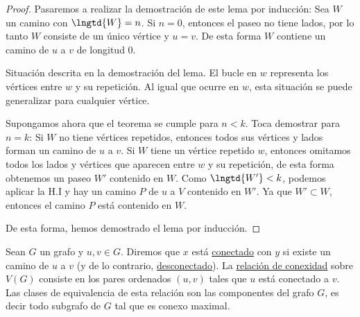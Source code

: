 \begin{proof}
    Pasaremos a realizar la demostración de este lema por inducción: Sea $W$ un camino con $\lngtd{W} = n$. Si $n = 0$, entonces el paseo no tiene lados, por lo tanto $W$ consiste de un único vértice y $u = v$. De esta forma $W$ contiene un camino de $u$ a $v$ de longitud $0$.
    
    \begin{marginfigure}
        \centering
        \caption{Situación descrita en la demostración del lema. El bucle en $w$ representa los vértices entre $w$ y su repetición. Al igual que ocurre en $w$, esta situación se puede generalizar para cualquier vértice.}
    \end{marginfigure}
    
    Supongamos ahora que el teorema se cumple para $n < k$. Toca demostrar para $n = k$: Si $W$ no tiene vértices repetidos, entonces todos sus vértices y lados forman un camino de $u$ a $v$. Si $W$ tiene un vértice repetido $w$, entonces omitamos todos los lados y vértices que aparecen entre $w$ y su repetición, de esta forma obtenemos un paseo $W'$ contenido en $W$. Como $\lngtd{W'} < k$, podemos aplicar la H.I y hay un camino $P$ de $u$ a $V$ contenido en $W'$. Ya que $W' \subset W$, entonces el camino $P$ está contenido en $W$.
    
    De esta forma, hemos demostrado el lema por inducción.
\end{proof}

\begin{defn}
    Sean $G$ un grafo y $u, v \in G$. Diremos que $x$ está \ul{conectado} con $y$ si existe un camino de $u$ a $v$ (y de lo contrario, \ul{desconectado}). La \ul{relación de conexidad} sobre $V(G)$ consiste en los pares ordenados $(u,v)$ tales que $u$ está conectado a $v$. Las clases de equivalencia de esta relación son las componentes del grafo $G$, es decir todo subgrafo de $G$ tal que es conexo maximal.
\end{defn}

